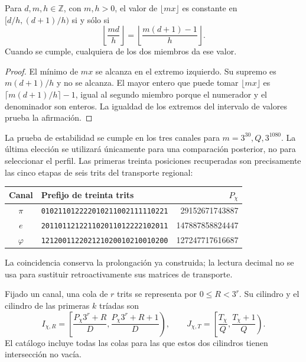 \begin{lemma}
\label{censo:estabilidad}
Para \(d,m,h\in\mathbb Z\), con \(m,h>0\), el valor de
\(\lfloor mx\rfloor\) es constante en \([d/h,(d+1)/h)\) si y sólo si
\begin{equation}
 \left\lfloor\frac{md}{h}\right\rfloor
 =\left\lfloor\frac{m(d+1)-1}{h}\right\rfloor.
 \label{censo:prueba-estabilidad}
\end{equation}
Cuando se cumple, cualquiera de los dos miembros da ese valor.
\end{lemma}
\begin{proof}
El mínimo de \(mx\) se alcanza en el extremo izquierdo. Su supremo
es \(m(d+1)/h\) y no se alcanza. El mayor entero que puede tomar
\(\lfloor mx\rfloor\) es
\(\lceil m(d+1)/h\rceil-1\), igual al segundo miembro porque
el numerador y el denominador son enteros. La igualdad de los extremos
del intervalo de valores prueba la afirmación.
\end{proof}

La prueba de estabilidad se cumple en los tres canales para
\(m=3^{30},Q,3^{1080}\). La última elección se utilizará únicamente
para una comparación posterior, no para seleccionar el perfil. Las
primeras treinta posiciones recuperadas son precisamente las cinco
etapas de seis trits del transporte regional:
\begin{center}\small
\begin{tabular}{@{}c l r@{}}\toprule
Canal&Prefijo de treinta trits&\(P_\chi\)\\\midrule
\(\pi\)&\texttt{010211012222010211002111110221}&29152671743887\\
\(e\)&\texttt{201101121221102011012222102011}&147887858824447\\
\(\varphi\)&\texttt{121200112202121020010210010200}&127247717616687\\\bottomrule
\end{tabular}
\end{center}
La coincidencia conserva la prolongación ya construida; la lectura decimal
no se usa para sustituir retroactivamente sus matrices de transporte.

Fijado un canal, una cola de \(r\) trits se representa por
\(0\leq R<3^r\). Su cilindro y el cilindro de las primeras \(k\)
tríadas son
\begin{equation}
 I_{\chi,R}=\left[\frac{P_\chi3^r+R}{D},
                       \frac{P_\chi3^r+R+1}{D}\right),\qquad
 J_{\chi,T}=\left[\frac{T_\chi}{Q},\frac{T_\chi+1}{Q}\right).
 \label{censo:dos-cilindros}
\end{equation}
El catálogo incluye todas las colas para las que estos dos cilindros
tienen intersección no vacía.

